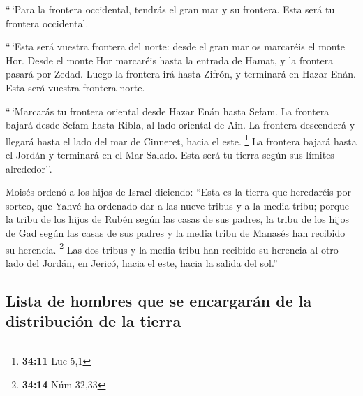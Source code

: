 \begin{paracol}{2}
 ``\,`Para la frontera occidental, tendrás el gran mar y
su frontera. Esta será tu frontera occidental.

 ``\,`Esta será vuestra frontera del norte: desde el gran
mar os marcaréis el monte Hor.  Desde el monte Hor
marcaréis hasta la entrada de Hamat, y la frontera pasará por Zedad.
 Luego la frontera irá hasta Zifrón, y terminará en Hazar
Enán. Esta será vuestra frontera norte.

 ``\,`Marcarás tu frontera oriental desde Hazar Enán
hasta Sefam.  La frontera bajará desde Sefam hasta Ribla,
al lado oriental de Ain. La frontera descenderá y llegará hasta el lado
del mar de Cinneret, hacia el este. \footnote{\textbf{34:11} Luc 5,1}
 La frontera bajará hasta el Jordán y terminará en el Mar
Salado. Esta será tu tierra según sus límites alrededor''.

 Moisés ordenó a los hijos de Israel diciendo: ``Esta es
la tierra que heredaréis por sorteo, que Yahvé ha ordenado dar a las
nueve tribus y a la media tribu;  porque la tribu de los
hijos de Rubén según las casas de sus padres, la tribu de los hijos de
Gad según las casas de sus padres y la media tribu de Manasés han
recibido su herencia. \footnote{\textbf{34:14} Núm 32,33}
 Las dos tribus y la media tribu han recibido su herencia
al otro lado del Jordán, en Jericó, hacia el este, hacia la salida del
sol.''

\hypertarget{lista-de-hombres-que-se-encargaruxe1n-de-la-distribuciuxf3n-de-la-tierra}{%
\subsection{Lista de hombres que se encargarán de la distribución de la
tierra}\label{lista-de-hombres-que-se-encargaruxe1n-de-la-distribuciuxf3n-de-la-tierra}}


\end{paracol}
